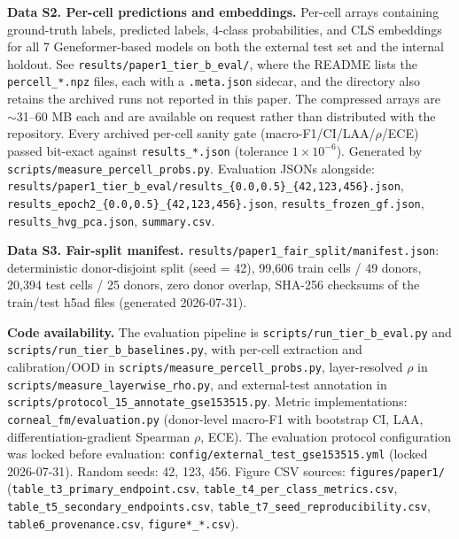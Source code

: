 \documentclass[12pt,a4paper]{article}
\begin{document}
\textbf{Data S2. Per-cell predictions and embeddings.} Per-cell arrays containing ground-truth labels, predicted labels, 4-class probabilities, and CLS embeddings for all 7 Geneformer-based models on both the external test set and the internal holdout. See \texttt{results/paper1\_tier\_b\_eval/}, where the README lists the \texttt{percell\_*.npz} files, each with a \texttt{.meta.json} sidecar, and the directory also retains the archived runs not reported in this paper. The compressed arrays are $\sim$31--60 MB each and are available on request rather than distributed with the repository. Every archived per-cell sanity gate (macro-F1/CI/LAA/$\rho$/ECE) passed bit-exact against \texttt{results\_*.json} (tolerance $1 \times 10^{-6}$). Generated by \texttt{scripts/measure\_percell\_probs.py}. Evaluation JSONs alongside: \texttt{results/paper1\_tier\_b\_eval/results\_\{0.0,0.5\}\_\{42,123,456\}.json}, \texttt{results\_epoch2\_\{0.0,0.5\}\_\{42,123,456\}.json}, \texttt{results\_frozen\_gf.json}, \texttt{results\_hvg\_pca.json}, \texttt{summary.csv}.

\textbf{Data S3. Fair-split manifest.} \texttt{results/paper1\_fair\_split/manifest.json}: deterministic donor-disjoint split (seed = 42), 99,606 train cells / 49 donors, 20,394 test cells / 25 donors, zero donor overlap, SHA-256 checksums of the train/test h5ad files (generated 2026-07-31).

\textbf{Code availability.} The evaluation pipeline is \texttt{scripts/run\_tier\_b\_eval.py} and \texttt{scripts/run\_tier\_b\_baselines.py}, with per-cell extraction and calibration/OOD in \texttt{scripts/measure\_percell\_probs.py}, layer-resolved $\rho$ in \texttt{scripts/measure\_layerwise\_rho.py}, and external-test annotation in \texttt{scripts/protocol\_15\_annotate\_gse153515.py}. Metric implementations: \texttt{corneal\_fm/evaluation.py} (donor-level macro-F1 with bootstrap CI, LAA, differentiation-gradient Spearman $\rho$, ECE). The evaluation protocol configuration was locked before evaluation: \texttt{config/external\_test\_gse153515.yml} (locked 2026-07-31). Random seeds: 42, 123, 456. Figure CSV sources: \texttt{figures/paper1/} (\texttt{table\_t3\_primary\_endpoint.csv}, \texttt{table\_t4\_per\_class\_metrics.csv}, \texttt{table\_t5\_secondary\_endpoints.csv}, \texttt{table\_t7\_seed\_reproducibility.csv}, \texttt{table6\_provenance.csv}, \texttt{figure*\_*.csv}).

\newpage
\end{document}
